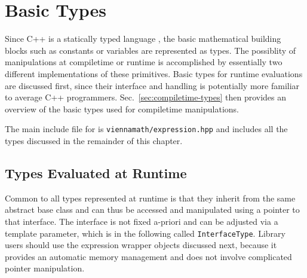 
\chapter{Basic Types} \label{chap:basics}

Since C++ is a statically typed language \cite{Stroustrup:cpp}, the basic mathematical building blocks such as constants or variables are represented as types.
The possiblity of manipulations at compiletime or runtime is accomplished by essentially
two different implementations of these primitives.
Basic types for runtime evaluations are discussed first, since their interface and handling is potentially more familiar to average C++ programmers.
Sec.~\ref{sec:compiletime-types} then provides an overview of the basic types used for compiletime manipulations.

The main include file for {\ViennaMath} is \lstinline|viennamath/expression.hpp| and includes all the types discussed in the remainder of this chapter.




\section{Types Evaluated at Runtime} \label{sec:runtime-types}
Common to all types represented at runtime is that they inherit from the same abstract base class 
and can thus be accessed and manipulated using a pointer to that interface.
The interface is not fixed a-priori and can be adjusted via a template parameter, which is in the following called \lstinline|InterfaceType|.
Library users should use the expression wrapper objects discussed next, because it provides an automatic memory management and does not involve complicated pointer manipulation.



